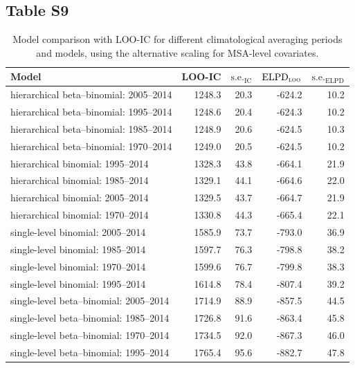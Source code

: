 \documentclass[draft]{agujournal}\usepackage{knitr}
\begin{document}
\subsection*{Table S9}
\begin{table}[H]
\centering
\begingroup\small
\begin{tabular}{p{3in}rrrr}
  \hline
Model & LOO-IC & $\text{s.e.}_{\text{IC}}$ & $\text{ELPD}_{\text{\scshape{loo}}}$ & $\text{s.e.}_{\text{ELPD}}$ \\ 
  \hline
hierarchical beta--binomial: 2005--2014 & 1248.3 & 20.3 & -624.2 & 10.2 \\ 
  hierarchical beta--binomial: 1995--2014 & 1248.6 & 20.4 & -624.3 & 10.2 \\ 
  hierarchical beta--binomial: 1985--2014 & 1248.9 & 20.6 & -624.5 & 10.3 \\ 
  hierarchical beta--binomial: 1970--2014 & 1249.0 & 20.5 & -624.5 & 10.2 \\ 
  hierarchical binomial: 1995--2014 & 1328.3 & 43.8 & -664.1 & 21.9 \\ 
  hierarchical binomial: 1985--2014 & 1329.1 & 44.1 & -664.6 & 22.0 \\ 
  hierarchical binomial: 2005--2014 & 1329.5 & 43.7 & -664.7 & 21.9 \\ 
  hierarchical binomial: 1970--2014 & 1330.8 & 44.3 & -665.4 & 22.1 \\ 
  single-level binomial: 2005--2014 & 1585.9 & 73.7 & -793.0 & 36.9 \\ 
  single-level binomial: 1985--2014 & 1597.7 & 76.3 & -798.8 & 38.2 \\ 
  single-level binomial: 1970--2014 & 1599.6 & 76.7 & -799.8 & 38.3 \\ 
  single-level binomial: 1995--2014 & 1614.8 & 78.4 & -807.4 & 39.2 \\ 
  single-level beta--binomial: 2005--2014 & 1714.9 & 88.9 & -857.5 & 44.5 \\ 
  single-level beta--binomial: 1985--2014 & 1726.8 & 91.6 & -863.4 & 45.8 \\ 
  single-level beta--binomial: 1970--2014 & 1734.5 & 92.0 & -867.3 & 46.0 \\ 
  single-level beta--binomial: 1995--2014 & 1765.4 & 95.6 & -882.7 & 47.8 \\ 
   \hline
\end{tabular}
\endgroup
\caption[Model comparison: LOO (climatological interval using alternative scaling).]{Model comparison with LOO-IC for different climatological averaging periods and models, using the alternative scaling for MSA-level covariates.} 
\label{tab:loo.years}
\end{table}
\end{document}
